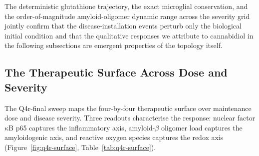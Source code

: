 \documentclass[10pt,letterpaper]{article}
\begin{document}
The deterministic glutathione trajectory, the exact microglial conservation, and the order-of-magnitude amyloid-oligomer dynamic range across the severity grid jointly confirm that the disease-installation events perturb only the biological initial condition and that the qualitative responses we attribute to cannabidiol in the following subsections are emergent properties of the topology itself.

\begin{table}[htbp]
\centering
\caption{Q3-final cascade response across disease severity in the untreated cascade. Mean endpoints over thirty replicates; standard deviation in parentheses; \texttt{run\_20260503\_140103}.}
\label{tab:q3-cascade}
\end{table}

\subsection{The Therapeutic Surface Across Dose and Severity}
\label{sec:r-q4r}

The Q4r-final sweep maps the four-by-four therapeutic surface over maintenance dose and disease severity. Three readouts characterise the response: nuclear factor $\kappa$B p65 captures the inflammatory axis, amyloid-$\beta$ oligomer load captures the amyloidogenic axis, and reactive oxygen species captures the redox axis (Figure~\ref{fig:q4r-surface}, Table~\ref{tab:q4r-surface}).
\end{document}
